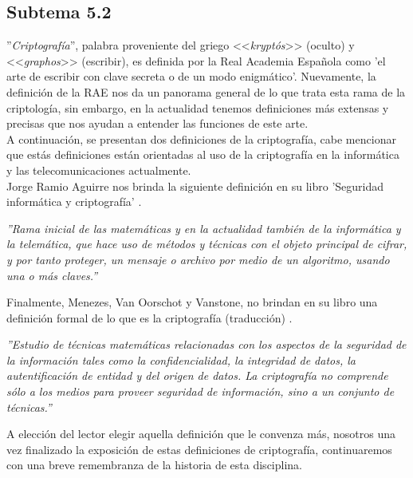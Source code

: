 \documentclass[12pt, a4paper, titlepage]{report}
\begin{document}
            \subsection{Subtema 5.2}
                ''\textit{Criptografía}'', palabra proveniente del griego <<\textit{kryptós}>> (oculto) y <<\textit{graphos}>> (escribir), es definida por la Real Academia Española como 'el arte de escribir con clave secreta o de un modo enigmático'. Nuevamente, la definición de la RAE nos da un panorama general de lo que trata esta rama de la criptología, sin embargo, en la actualidad tenemos definiciones más extensas y precisas que nos ayudan a entender las funciones de este arte.\\
                
                A continuación, se presentan dos definiciones de la criptografía, cabe mencionar que estás definiciones están orientadas al uso de la criptografía en la informática y las telecomunicaciones actualmente.\\
                Jorge Ramio Aguirre nos brinda la siguiente definición en su libro 'Seguridad informática y criptografía' \cite{refRamioAguirre}.
                \begin{center}
                    \textit{''Rama inicial de las matemáticas y en la actualidad también de la informática y la telemática, que hace uso de métodos y técnicas con el objeto principal de cifrar, y por tanto proteger, un mensaje o archivo por medio de un algoritmo, usando una o más claves.''}
                \end{center}
                Finalmente, Menezes, Van Oorschot y Vanstone, no brindan en su libro una definición formal de lo que es la criptografía (traducción) \cite{refHandBookOfAppliedCryptography}.
                \begin{center}
                    \textit{''Estudio de técnicas matemáticas relacionadas con los aspectos de la seguridad de la información tales como la confidencialidad, la integridad de datos, la autentificación de entidad y del origen de datos. La criptografía no comprende sólo a los medios para proveer seguridad de información, sino a un conjunto de técnicas.''}
                \end{center}
                
                A elección del lector elegir aquella definición que le convenza más, nosotros una vez finalizado la exposición de estas definiciones de criptografía, continuaremos con una breve remembranza de la historia de esta disciplina.\\
                
\end{document}
